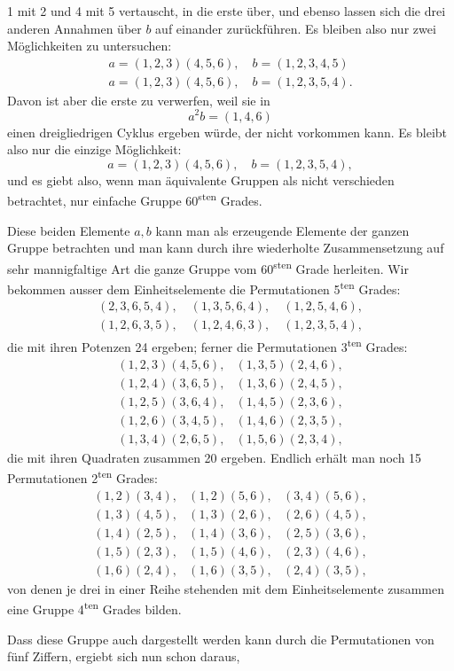 1 mit 2 und 4 mit 5 vertauscht, in die erste über, und ebenso lassen sich die drei anderen Annahmen über $b$ auf einander zurückführen. Es bleiben also nur zwei Möglichkeiten zu untersuchen:
\[
\begin{gathered}
a = (1, 2, 3) (4, 5, 6), \quad b = (1, 2, 3, 4, 5) \\
a = (1, 2, 3) (4, 5, 6), \quad b = (1, 2, 3, 5, 4).
\end{gathered}
\]
Davon ist aber die erste zu verwerfen, weil sie in
\[
a^2 b = (1, 4, 6)
\]
einen dreigliedrigen Cyklus ergeben würde, der nicht vorkommen kann. Es bleibt also nur die einzige Möglichkeit:
\[
a = (1, 2, 3) (4, 5, 6), \quad b = (1, 2, 3, 5, 4),
\]
und es giebt also, wenn man äquivalente Gruppen als nicht verschieden betrachtet, nur  einfache Gruppe 60\textsuperscript{sten} Grades.

Diese beiden Elemente $a, b$ kann man als erzeugende Elemente der ganzen Gruppe betrachten und man kann durch ihre wiederholte Zusammensetzung auf sehr mannigfaltige Art die ganze Gruppe vom 60\textsuperscript{sten} Grade herleiten. Wir bekommen ausser dem Einheitselemente die Permutationen 5\textsuperscript{ten} Grades:
\[
\begin{gathered}
(2, 3, 6, 5, 4), \quad (1, 3, 5, 6, 4), \quad (1, 2, 5, 4, 6), \\
(1, 2, 6, 3, 5), \quad (1, 2, 4, 6, 3), \quad (1, 2, 3, 5, 4),
\end{gathered}
\]
die mit ihren Potenzen 24 ergeben; ferner die Permutationen 3\textsuperscript{ten} Grades:
\[
\begin{array}{ll}
(1, 2, 3) (4, 5, 6), & (1, 3, 5) (2, 4, 6), \\
(1, 2, 4) (3, 6, 5), & (1, 3, 6) (2, 4, 5), \\
(1, 2, 5) (3, 6, 4), & (1, 4, 5) (2, 3, 6), \\
(1, 2, 6) (3, 4, 5), & (1, 4, 6) (2, 3, 5), \\
(1, 3, 4) (2, 6, 5), & (1, 5, 6) (2, 3, 4),
\end{array}
\]
die mit ihren Quadraten zusammen 20 ergeben. Endlich erhält man noch 15 Permutationen 2\textsuperscript{ten} Grades:
\[
\begin{array}{lll}
(1, 2) (3, 4), & (1, 2) (5, 6), & (3, 4) (5, 6), \\
(1, 3) (4, 5), & (1, 3) (2, 6), & (2, 6) (4, 5), \\
(1, 4) (2, 5), & (1, 4) (3, 6), & (2, 5) (3, 6), \\
(1, 5) (2, 3), & (1, 5) (4, 6), & (2, 3) (4, 6), \\
(1, 6) (2, 4), & (1, 6) (3, 5), & (2, 4) (3, 5),
\end{array}
\]
von denen je drei in einer Reihe stehenden mit dem Einheitselemente zusammen eine Gruppe 4\textsuperscript{ten} Grades bilden.

Dass diese Gruppe auch dargestellt werden kann durch die Permutationen von fünf Ziffern, ergiebt sich nun schon daraus,
